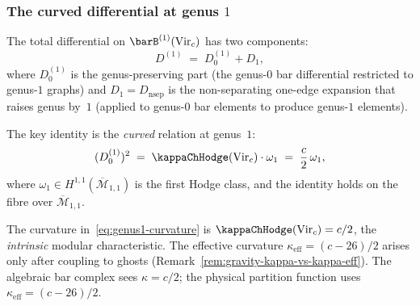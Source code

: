 \subsubsection*{The curved differential at genus $1$}

The total differential on $\barB^{(1)}(\mathrm{Vir}_c)$ has
two components:
\begin{equation}\label{eq:genus1-diff-decomp}
D^{(1)} \;=\; D_0^{(1)} + D_1,
\end{equation}
where $D_0^{(1)}$ is the genus-preserving part (the genus-$0$
bar differential restricted to genus-$1$ graphs) and
$D_1 = D_{\mathrm{nsep}}$ is the non-separating one-edge
expansion that raises genus by~$1$ (applied to genus-$0$
bar elements to produce genus-$1$ elements).

The key identity is the \emph{curved} relation at genus~$1$:
\begin{equation}\label{eq:genus1-curvature}
(D_0^{(1)})^2 \;=\; \kappaChHodge(\mathrm{Vir}_c) \cdot \omega_1
\;=\; \frac{c}{2}\,\omega_1,
\end{equation}
where $\omega_1 \in H^{1,1}(\overline{\mathcal{M}}_{1,1})$
is the first Hodge class, and the identity holds on the fibre over
$\overline{\mathcal{M}}_{1,1}$.

\begin{remark}
\label{rem:genus1-intrinsic-curvature}
The curvature in~\eqref{eq:genus1-curvature} is
$\kappaChHodge(\mathrm{Vir}_c) = c/2$, the \emph{intrinsic} modular
characteristic. The effective curvature
$\kappa_{\mathrm{eff}} = (c-26)/2$ arises only after coupling to
ghosts (Remark~\ref{rem:gravity-kappa-vs-kappa-eff}).
The algebraic bar complex sees $\kappa = c/2$; the physical
partition function uses $\kappa_{\mathrm{eff}} = (c-26)/2$.
\end{remark}


